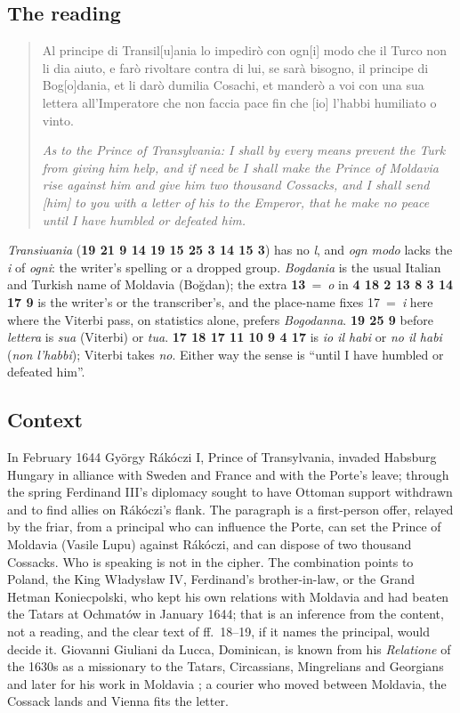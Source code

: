 \documentclass[11pt]{article}
\begin{document}
\subsection{The reading}

\begin{quote}\small
Al principe di Transil[u]ania lo impedir\`o con ogn[i] modo che il Turco non li dia aiuto, e far\`o rivoltare contra di lui, se sar\`a bisogno, il principe di Bog[o]dania, et li dar\`o dumilia Cosachi, et mander\`o a voi con una sua lettera all'Imperatore che non faccia pace fin che [io] l'habbi humiliato o vinto.

\emph{As to the Prince of Transylvania: I shall by every means prevent the Turk from giving him help, and if need be I shall make the Prince of Moldavia rise against him and give him two thousand Cossacks, and I shall send [him] to you with a letter of his to the Emperor, that he make no peace until I have humbled or defeated him.}
\end{quote}

\emph{Transiuania} (\textbf{19 21 9 14 19 15 25 3 14 15 3}) has no \emph{l}, and \emph{ogn modo} lacks the \emph{i} of \emph{ogni}: the writer's spelling or a dropped group. \emph{Bogdania} is the usual Italian and Turkish name of Moldavia (Bo\u{g}dan); the extra \textbf{13}~=~\emph{o} in \textbf{4 18 2 13 8 3 14 17 9} is the writer's or the transcriber's, and the place-name fixes 17~=~\emph{i} here where the Viterbi pass, on statistics alone, prefers \emph{Bogodanna}. \textbf{19 25 9} before \emph{lettera} is \emph{sua} (Viterbi) or \emph{tua}. \textbf{17 18 17 11 10 9 4 17} is \emph{io il habi} or \emph{no il habi} (\emph{non l'habbi}); Viterbi takes \emph{no}. Either way the sense is ``until I have humbled or defeated him''.

\subsection{Context}

In February 1644 Gy\"orgy R\'ak\'oczi I, Prince of Transylvania, invaded Habsburg Hungary in alliance with Sweden and France and with the Porte's leave; through the spring Ferdinand III's diplomacy sought to have Ottoman support withdrawn and to find allies on R\'ak\'oczi's flank. The paragraph is a first-person offer, relayed by the friar, from a principal who can influence the Porte, can set the Prince of Moldavia (Vasile Lupu) against R\'ak\'oczi, and can dispose of two thousand Cossacks. Who is speaking is not in the cipher. The combination points to Poland, the King W\l adys\l aw IV, Ferdinand's brother-in-law, or the Grand Hetman Koniecpolski, who kept his own relations with Moldavia and had beaten the Tatars at Ochmat\'ow in January 1644; that is an inference from the content, not a reading, and the clear text of ff.~18--19, if it names the principal, would decide it. Giovanni Giuliani da Lucca, Dominican, is known from his \emph{Relatione} of the 1630s as a missionary to the Tatars, Circassians, Mingrelians and Georgians and later for his work in Moldavia \cite{Luca:2004}; a courier who moved between Moldavia, the Cossack lands and Vienna fits the letter.
\end{document}
